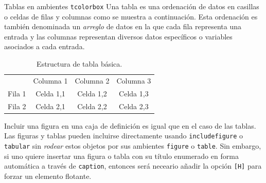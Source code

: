 \documentclass[11pt,letterpaper,twoside]{report}%
\begin{document}
\begin{center}
\begin{defbox}{Tablas en ambientes \texttt{tcolorbox}}
Una tabla es una ordenación de datos en casillas o celdas de filas y columnas como se muestra a continuación.  Esta ordenación es también denominada un {\em arreglo} de datos en la que cada fila representa una entrada y las columnas representan diversos datos específicos o variables asociados a cada entrada.

\begin{table}[H]
\centering
\caption{Estructura de tabla básica.}
\label{tab:basica}
\begin{tabular}{r|ccc}
\multicolumn{1}{r}{}
& \multicolumn{1}{c}{Columna 1}
& \multicolumn{1}{c}{Columna 2}
& \multicolumn{1}{c}{Columna 3} \\ \cline{2-4}
Fila 1 & Celda 1,1 & Celda 1,2 & Celda 1,3 \\
Fila 2 & Celda 2,1 & Celda 2,2 & Celda 2,3
\end{tabular}%
\end{table}

\begin{table}[H]
\centering
\caption{Estructura de tabla básica escalada.}
\label{tab:basica_escalada}
\end{table}

\end{defbox}
\end{center}

Incluir una figura en una caja de definición es igual que en el caso de las tablas.  Las figuras y tablas pueden incluirse directamente usando \texttt{includefigure} o \texttt{tabular} sin {\em rodear} estos objetos por sus ambientes \texttt{figure} o \texttt{table}.  Sin embargo, si uno quiere insertar una figura o tabla con su título enumerado en forma automática a través de \texttt{caption}, entonces será neceario añadir la opción \texttt{[H]} para forzar un elemento flotante. 
\end{document}
